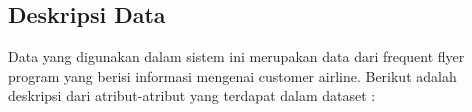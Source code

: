 \subsection{Deskripsi Data}

Data yang digunakan dalam sistem ini merupakan data dari frequent flyer program yang berisi informasi mengenai customer airline. Berikut adalah deskripsi dari atribut-atribut yang terdapat dalam dataset :


